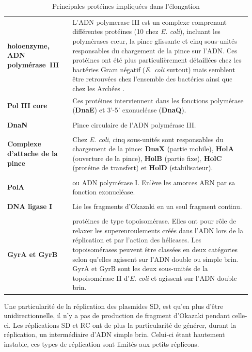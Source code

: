 \begin{longtable}{@{\hspace{-2cm}\hspace{1cm}} >{\bfseries}p{} | >{\small}p{}}
	\caption{Principales protéines impliquées dans l'élongation}\label{tabelongprot}\\
	\endfirsthead
	holoenzyme, \mbox{ADN} \mbox{polymérase III} & L'ADN polymerase III est un complexe comprenant différentes protéines (10 chez \textit{E. coli}), incluant les polymérases cœur, la pince glissante et cinq sous-unités responsables du chargement de la pince sur l'ADN. Ces protéines ont été plus particulièrement détaillées chez les bactéries Gram négatif (\textit{E. coli} surtout) mais semblent être retrouvées chez l'ensemble des bactéries ainsi que chez les Archées \citep{o2013principles}.\\
	Pol III core & Ces protéines interviennent dans les fonctions polymérase (\textbf{DnaE}) et 3'-5' exonucléase (\textbf{DnaQ}).\\
	\\[-0.2cm]
	DnaN & Pince circulaire de l'ADN polymérase III.\\
	\\[-0.2cm]
	Complexe d'attache de la pince & Chez \textit{E. coli}, cinq sous-unités sont responsables du chargement de la pince: \textbf{DnaX} (partie mobile), \textbf{HolA} (ouverture de la pince), \textbf{HolB} (partie fixe), \textbf{HolC} (protéine de transfert) et \textbf{HolD} (stabilisateur).\\
	\\[-0.2cm]
	PolA & ou ADN polymérase I. Enlève les amorces ARN par sa fonction exonucléase.\\
	\\[-0.2cm]
	DNA ligase I & Lie les fragments d'Okazaki en un seul fragment continu.\\
	\\[-0.2cm]
	GyrA et GyrB & protéines de type topoisomérase. Elles ont pour rôle de relaxer les superenroulements créés dans l'ADN lors de la réplication et par l'action des hélicases. Les topoisomérases peuvent être classées en deux catégories selon qu'elles agissent sur l'ADN double ou simple brin. GyrA et GyrB sont les deux sous-unités de la topoisomérase II d'\textit{E. coli} et agissent sur l'ADN double brin.\\
\end{longtable}

Une particularité de la réplication des plasmides SD, est qu'en plus d'être unidirectionnelle, il n'y a pas de production de fragment d'Okazaki pendant celle-ci. Les réplications SD et RC ont de plus la particularité de générer, durant la réplication, un intermédiaire d'ADN simple brin. Celui-ci étant hautement instable, ces types de réplication sont limités aux petits réplicons. 


